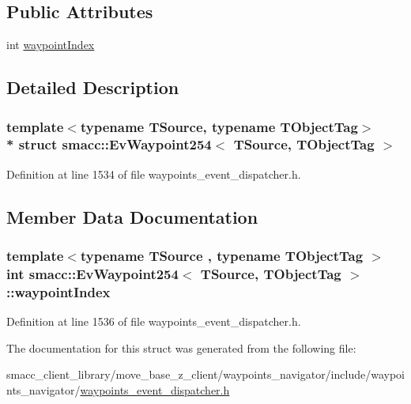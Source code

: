 \subsection*{Public Attributes}
\begin{DoxyCompactItemize}
\item 
int \hyperlink{structsmacc_1_1EvWaypoint254_a4e9a018732fcd11c40c36b1f015a0e31}{waypoint\+Index}
\end{DoxyCompactItemize}


\subsection{Detailed Description}
\subsubsection*{template$<$typename T\+Source, typename T\+Object\+Tag$>$\\*
struct smacc\+::\+Ev\+Waypoint254$<$ T\+Source, T\+Object\+Tag $>$}



Definition at line 1534 of file waypoints\+\_\+event\+\_\+dispatcher.\+h.



\subsection{Member Data Documentation}
\subsubsection[{\texorpdfstring{waypoint\+Index}{waypointIndex}}]{\setlength{\rightskip}{0pt plus 5cm}template$<$typename T\+Source , typename T\+Object\+Tag $>$ int {\bf smacc\+::\+Ev\+Waypoint254}$<$ T\+Source, T\+Object\+Tag $>$\+::waypoint\+Index}\hypertarget{structsmacc_1_1EvWaypoint254_a4e9a018732fcd11c40c36b1f015a0e31}{}\label{structsmacc_1_1EvWaypoint254_a4e9a018732fcd11c40c36b1f015a0e31}


Definition at line 1536 of file waypoints\+\_\+event\+\_\+dispatcher.\+h.



The documentation for this struct was generated from the following file\+:\begin{DoxyCompactItemize}
\item 
smacc\+\_\+client\+\_\+library/move\+\_\+base\+\_\+z\+\_\+client/waypoints\+\_\+navigator/include/waypoints\+\_\+navigator/\hyperlink{waypoints__event__dispatcher_8h}{waypoints\+\_\+event\+\_\+dispatcher.\+h}\end{DoxyCompactItemize}
